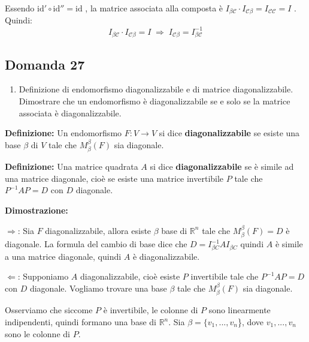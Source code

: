 \documentclass[
  a4paper,
]{article}
\providecommand{\tightlist}{%
  \setlength{\itemsep}{0pt}\setlength{\parskip}{0pt}}
\providecommand{\tightlist}{}
\begin{document}
Essendo \(\text{id}' \circ \text{id}'' = \text{id}\) , la matrice
associata alla composta è
\(I_{\beta \mathcal{C}} \cdot I_{\mathcal{C} \beta} = I_{\mathcal{C} \mathcal{C}} = I\)
. Quindi: \[
I_{\beta \mathcal{C}} \cdot I_{\mathcal{C} \beta} = I \;\Longrightarrow\; I_{\mathcal{C} \beta} = I_{\beta \mathcal{C}}^{-1}
\]

\hypertarget{domanda-27}{%
\subsection{Domanda 27}\label{domanda-27}}

\begin{observationbox}[Domanda]
\begin{enumerate}
\def\labelenumi{\arabic{enumi}.}
\setcounter{enumi}{26}
\tightlist
\item
  Definizione di endomorfismo diagonalizzabile e di matrice
  diagonalizzabile. Dimostrare che un endomorfismo è diagonalizzabile se
  e solo se la matrice associata è diagonalizzabile.
\end{enumerate}
\end{observationbox}

\textbf{Definizione:} Un endomorfismo \(F: V \to V\) si dice
\textbf{diagonalizzabile} se esiste una base \(\beta\) di \(V\) tale che
\(M^{{\beta}}_{\beta}(F)\) sia diagonale.

\textbf{Definizione:} Una matrice quadrata \(A\) si dice
\textbf{diagonalizzabile} se è simile ad una matrice diagonale, cioè se
esiste una matrice invertibile \(P\) tale che \(P^{-1}AP = D\) con \(D\)
diagonale.

\textbf{Dimostrazione:}

\(\Rightarrow\): Sia \(F\) diagonalizzabile, allora esiste \(\beta\)
base di \(\mathbb{R}^n\) tale che \(M^{{\beta}}_{\beta}(F) = D\) è
diagonale. La formula del cambio di base dice che
\(D = I^{{-1}}_{\beta C}AI_{\beta C}\) quindi \(A\) è simile a una
matrice diagonale, quindi \(A\) è diagonalizzabile.

\(\Leftarrow\): Supponiamo \(A\) diagonalizzabile, cioè esiste \(P\)
invertibile tale che \(P^{-1}AP = D\) con \(D\) diagonale. Vogliamo
trovare una base \(\beta\) tale che \(M^{{\beta}}_{\beta}(F)\) sia
diagonale.

Osserviamo che siccome \(P\) è invertibile, le colonne di \(P\) sono
linearmente indipendenti, quindi formano una base di \(\mathbb{R}^n\).
Sia \(\beta = \{v_1, ..., v_n\)\}, dove \(v_1, ..., v_n\) sono le
colonne di \(P\).
\end{document}
